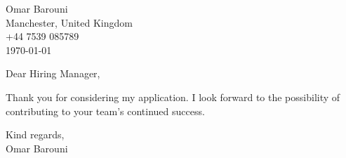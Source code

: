 \documentclass[11pt,a4paper]{letter}
\begin{document}
\setlength{\parskip}{1em} %

\begin{flushright}
Omar Barouni\\
Manchester, United Kingdom\\
+44 7539 085789\\
\today
\end{flushright}

Dear Hiring Manager,


Thank you for considering my application. I look forward to the possibility of contributing to your
team’s continued success.

Kind regards,\\
Omar Barouni
\end{document}
